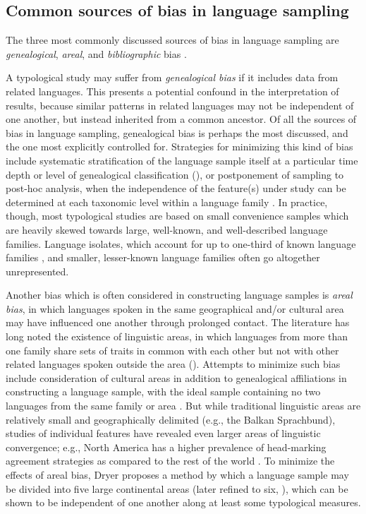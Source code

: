 \subsection{Common sources of bias in language sampling}\label{sec:2.1.1}

  The three most commonly discussed sources of bias in language sampling are \textit{genealogical}, \textit{areal}, and \textit{bibliographic} bias \citep{Bakker2011}. 

  A typological study may suffer from \textit{genealogical bias} if it includes data from related languages. This presents a potential confound in the interpretation of results, because similar patterns in related languages may not be independent of one another, but instead inherited from a common ancestor. Of all the sources of bias in language sampling, genealogical bias is perhaps the most discussed, and the one most explicitly controlled for. Strategies for minimizing this kind of bias include systematic stratification of the language sample itself at a particular time depth or level of genealogical classification (\citealt{Bell1978b,Maddieson1984,Dryer1989}), or postponement of sampling to post-hoc analysis, when the independence of the feature(s) under study can be determined at each taxonomic level within a language family \citep{Bickel2008}. In practice, though, most typological studies are based on small convenience samples which are heavily skewed towards large, well-known, and well-described language families. Language isolates, which account for up to one-third of known language families \citep{Campbell2016}, and smaller, lesser-known language families often go altogether unrepresented.

  Another bias which is often considered in constructing language samples is \textit{areal bias}, in which languages spoken in the same geographical and/or cultural area may have influenced one another through prolonged contact. The literature has long noted the existence of linguistic areas, in which languages from more than one family share sets of traits in common with each other but not with other related languages spoken outside the area (\citealt{AikhenvaldDixon2001a,Chirikba2008}). Attempts to minimize such bias include consideration of cultural areas in addition to genealogical affiliations in constructing a language sample, with the ideal sample containing no two languages from the same family or area \citep{Perkins1985}. But while traditional linguistic areas are relatively small and geographically delimited (e.g., the Balkan Sprachbund), studies of individual features have revealed even larger areas of linguistic convergence; e.g., North America has a higher prevalence of head-marking agreement strategies as compared to the rest of the world \citep{Dryer1989}. To minimize the effects of areal bias, Dryer proposes a method by which a language sample may be divided into five large continental areas (later refined to six, \citealt{Dryer1992}), which can be shown to be independent of one another along at least some typological measures.

